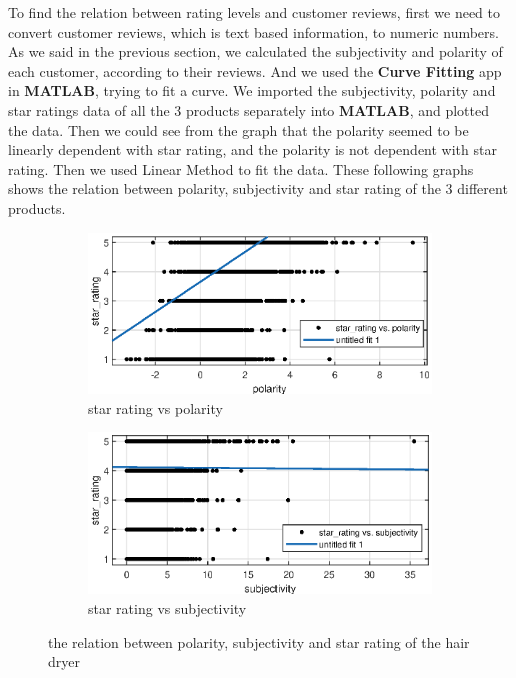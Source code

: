 \documentclass[12pt]{article}  %
\begin{document}
To find the relation between rating levels and customer reviews, first we need to convert customer reviews, which is text based information, to numeric numbers. As we said in the previous section, we calculated the subjectivity and polarity of each customer, according to their reviews. And we used the \textbf{Curve Fitting} app in \textbf{MATLAB}, trying to fit a curve.
We imported the subjectivity, polarity and star ratings data of all the 3 products separately into \textbf{MATLAB}, and plotted the data. Then we could see from the graph that the polarity seemed to be linearly dependent with star rating, and the polarity is not dependent with star rating.
Then we used Linear Method to fit the data. These following graphs shows the relation between polarity, subjectivity and star rating of the 3 different products.
\begin{figure}[H]
  \centering
  \begin{subfigure}{.5\textwidth}
    \centering
    \includegraphics[width=\linewidth]{figures/hair_dryer/polarity_vs_star_rating.eps}
    \caption{star rating vs polarity}
    \label{fig:}
  \end{subfigure}%
  \begin{subfigure}{.5\textwidth}
    \centering
    \includegraphics[width=\linewidth]{figures/hair_dryer/subjectivity_vs_star_rating.eps}
    \caption{star rating vs subjectivity}
    \label{fig:}
  \end{subfigure}
  \caption{the relation between polarity, subjectivity and star rating of the hair dryer}
  \label{fig:}
\end{figure}
\end{document}
